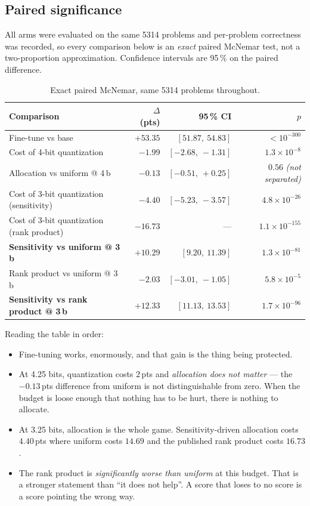 \documentclass[11pt]{article}
\newcommand{\pt}{\,pts}
\newcommand{\pct}{\,\%}
\begin{document}
\subsection{Paired significance}

All arms were evaluated on the same 5314 problems and per-problem correctness was recorded, so
every comparison below is an \emph{exact} paired McNemar test, not a two-proportion
approximation. Confidence intervals are 95\pct{} on the paired difference.

\begin{table}[H]
\centering\small
\caption{Exact paired McNemar, same 5314 problems throughout.}
\begin{tabular}{lrrr}
\toprule
Comparison & $\Delta$ (pts) & 95\pct{} CI & $p$ \\
\midrule
\rowcolor{rowtint}
Fine-tune vs base & $+53.35$ & $[51.87,\ 54.83]$ & $<10^{-300}$ \\
\midrule
Cost of 4-bit quantization & $-1.99$ & $[-2.68,\ -1.31]$ & $1.3\times10^{-8}$ \\
\rowcolor{rowtint}
Allocation vs uniform @ 4\,b & $-0.13$ & $[-0.51,\ +0.25]$ & $0.56$ \emph{(not separated)} \\
\midrule
Cost of 3-bit quantization (sensitivity) & $-4.40$ & $[-5.23,\ -3.57]$ & $4.8\times10^{-26}$ \\
\rowcolor{rowtint}
Cost of 3-bit quantization (rank product) & $-16.73$ & --- & $1.1\times10^{-155}$ \\
\midrule
\rowcolor{rowtint}
\textbf{Sensitivity vs uniform @ 3\,b} & $\mathbf{+10.29}$ & $[9.20,\ 11.39]$ & $1.3\times10^{-81}$ \\
Rank product vs uniform @ 3\,b & $\mathbf{-2.03}$ & $[-3.01,\ -1.05]$ & $5.8\times10^{-5}$ \\
\rowcolor{rowtint}
\textbf{Sensitivity vs rank product @ 3\,b} & $\mathbf{+12.33}$ & $[11.13,\ 13.53]$ & $1.7\times10^{-96}$ \\
\bottomrule
\end{tabular}
\end{table}

Reading the table in order:

\begin{itemize}
\item Fine-tuning works, enormously, and that gain is the thing being protected.
\item At 4.25 bits, quantization costs $2$\pt{} and \emph{allocation does not matter} --- the
$-0.13$\pt{} difference from uniform is not distinguishable from zero. When the budget is loose
enough that nothing has to be hurt, there is nothing to allocate.
\item At 3.25 bits, allocation is the whole game. Sensitivity-driven allocation costs $4.40$\pt{}
where uniform costs $14.69$ and the published rank product costs $16.73$.
\item The rank product is \emph{significantly worse than uniform} at this budget. That is a
stronger statement than ``it does not help''. A score that loses to no score is a score pointing
the wrong way.
\end{itemize}
\end{document}
